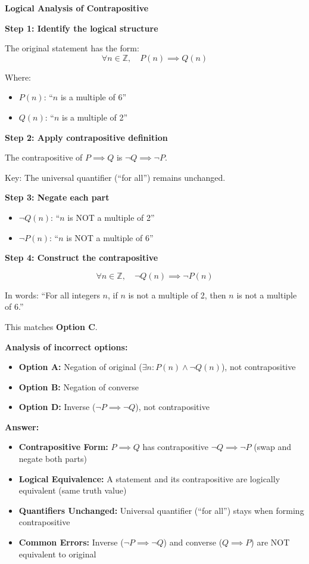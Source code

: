 \begin{solution}
\textbf{Logical Analysis of Contrapositive}

\textbf{Step 1: Identify the logical structure}

The original statement has the form:
\[ \forall n \in \mathbb{Z}, \quad P(n) \implies Q(n) \]

Where:
\begin{itemize}
    \item $P(n)$: ``$n$ is a multiple of 6''
    \item $Q(n)$: ``$n$ is a multiple of 2''
\end{itemize}

\textbf{Step 2: Apply contrapositive definition}

The contrapositive of $P \implies Q$ is $\neg Q \implies \neg P$.

Key: The universal quantifier (``for all'') remains unchanged.

\textbf{Step 3: Negate each part}

\begin{itemize}
    \item $\neg Q(n)$: ``$n$ is NOT a multiple of 2''
    \item $\neg P(n)$: ``$n$ is NOT a multiple of 6''
\end{itemize}

\textbf{Step 4: Construct the contrapositive}

\[ \forall n \in \mathbb{Z}, \quad \neg Q(n) \implies \neg P(n) \]

In words: ``For all integers $n$, if $n$ is not a multiple of 2, then $n$ is not a multiple of 6.''

This matches \textbf{Option C}.

\textbf{Analysis of incorrect options:}
\begin{itemize}
    \item \textbf{Option A:} Negation of original ($\exists n: P(n) \land \neg Q(n)$), not contrapositive
    \item \textbf{Option B:} Negation of converse
    \item \textbf{Option D:} Inverse ($\neg P \implies \neg Q$), not contrapositive
\end{itemize}

\textbf{Answer:} 
\end{solution}

\begin{takeaways}
\begin{itemize}
\item \textbf{Contrapositive Form:} $P \implies Q$ has contrapositive $\neg Q \implies \neg P$ (swap and negate both parts)
\item \textbf{Logical Equivalence:} A statement and its contrapositive are logically equivalent (same truth value)
\item \textbf{Quantifiers Unchanged:} Universal quantifier (``for all'') stays when forming contrapositive
\item \textbf{Common Errors:} Inverse ($\neg P \implies \neg Q$) and converse ($Q \implies P$) are NOT equivalent to original
\end{itemize}
\end{takeaways}
